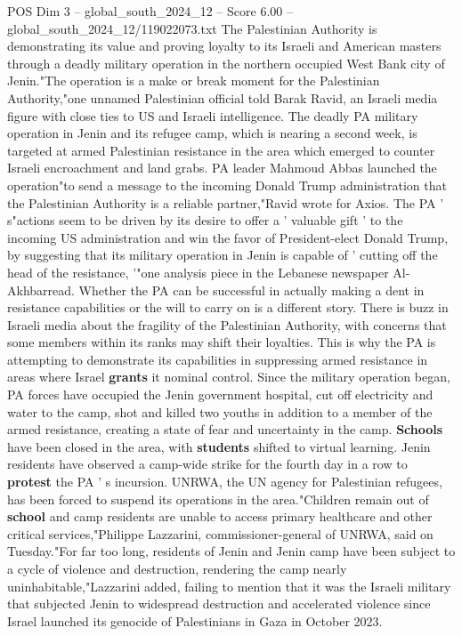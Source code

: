 \begin{textsample}{POS Dim 3 – global\_south\_2024\_12 – Score 6.00 – global\_south\_2024\_12/119022073.txt}  \label{ex:f3_pos_397}
The Palestinian Authority is demonstrating its value and proving loyalty to its Israeli and American masters through a deadly military operation in the northern occupied West Bank city of Jenin."The operation is a make or break moment for the Palestinian Authority,"one unnamed Palestinian official told Barak Ravid, an Israeli media figure with close ties to US and Israeli intelligence.
The deadly PA military operation in Jenin and its refugee camp, which is nearing a second week, is targeted at armed Palestinian resistance in the area which emerged to counter Israeli encroachment and land grabs.
PA leader Mahmoud Abbas launched the operation"to send a message to the incoming Donald Trump administration that the Palestinian Authority is a reliable partner,"Ravid wrote for Axios.
The PA ' s"actions seem to be driven by its desire to offer a ' valuable gift ' to the incoming US administration and win the favor of President-elect Donald Trump, by suggesting that its military operation in Jenin is capable of ' cutting off the head of the resistance, '"one analysis piece in the Lebanese newspaper Al-Akhbarread.
Whether the PA can be successful in actually making a dent in resistance capabilities or the will to carry on is a different story.
There is buzz in Israeli media about the fragility of the Palestinian Authority, with concerns that some members within its ranks may shift their loyalties.
This is why the PA is attempting to demonstrate its capabilities in suppressing armed resistance in areas where Israel \textbf{grants} it nominal control.
Since the military operation began, PA forces have occupied the Jenin government hospital, cut off electricity and water to the camp, shot and killed two youths in addition to a member of the armed resistance, creating a state of fear and uncertainty in the camp. \textbf{Schools} have been closed in the area, with \textbf{students} shifted to virtual learning.
Jenin residents have observed a camp-wide strike for the fourth day in a row to \textbf{protest} the PA ' s incursion.
UNRWA, the UN agency for Palestinian refugees, has been forced to suspend its operations in the area."Children remain out of \textbf{school} and camp residents are unable to access primary healthcare and other critical services,"Philippe Lazzarini, commissioner-general of UNRWA, said on Tuesday."For far too long, residents of Jenin and Jenin camp have been subject to a cycle of violence and destruction, rendering the camp nearly uninhabitable,"Lazzarini added, failing to mention that it was the Israeli military that subjected Jenin to widespread destruction and accelerated violence since Israel launched its genocide of Palestinians in Gaza in October 2023.

\end{textsample}

